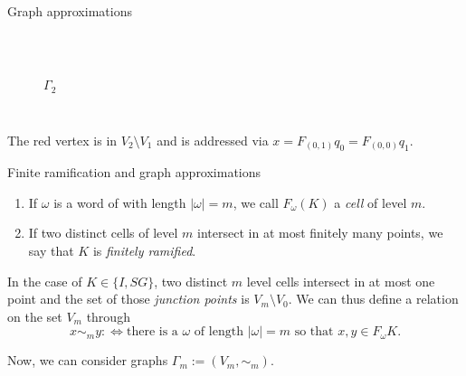 \begin{frame}{Graph approximations}
\begin{example}
\begin{enumerate}
\begin{columns}[c]
\begin{figure}
\\
                \centering
                \(\Gamma_2 \)
            \end{figure}
        \end{columns}
    \end{enumerate}
    \end{example}
    The red vertex is in \(V_2 \setminus V_1 \) and is addressed via \(x = F_{(0, 1)}q_0 = F_{(0,0)}q_1 \).
\end{frame}

\begin{frame}{Finite ramification and graph approximations}
    \begin{definition}
        \begin{enumerate}
            \item If \(\omega \) is a word of with length \(| \omega | = m \), we call \(F_\omega (K) \) a \textit{cell} of level \(m \).
            \item If two distinct cells of level \(m \) intersect in at most finitely many points, we say that \(K \) is \textit{finitely ramified}.
        \end{enumerate}
    \end{definition}

    In the case of \(K \in \{I, SG \} \), two distinct \(m \) level cells intersect in at most one point and the set of those \textit{junction points} is \(V_m \setminus V_0 \). We can thus define a relation on the set \(V_m \) through
    \[ x \sim_m y :\Leftrightarrow \text{there is a } \omega \text{ of length } | \omega | = m \text{ so that } x, y \in F_\omega K. \]

    Now, we can consider graphs \(\Gamma_m := (V_m, \sim_m) \).
\end{frame}

